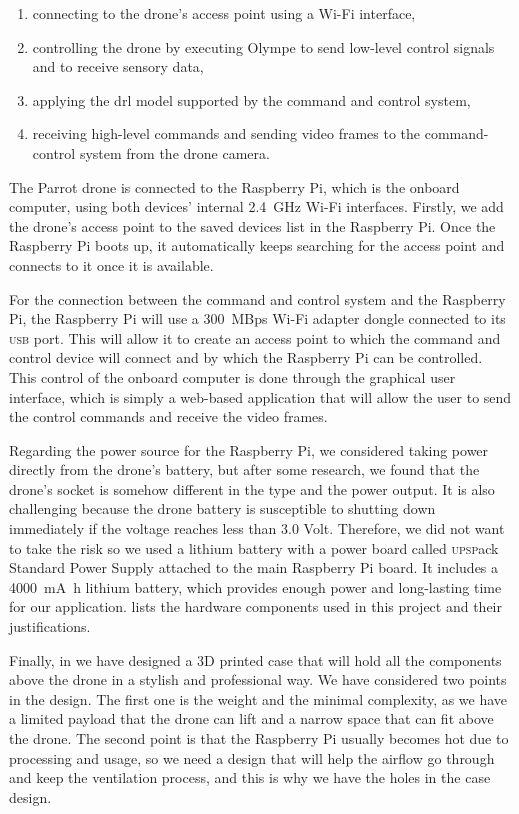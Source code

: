 \documentclass[../main.tex]{subfiles}
\begin{document}
\begin{enumerate}
	\item connecting to the drone's access point 
	using a Wi-Fi interface,
	\item controlling the drone 
	by executing Olympe to send low-level control signals 
	and to receive sensory data,
	\item applying the \gls{drl} model supported by 
	the command and control system,
	\item receiving high-level commands and sending video 
	frames to the command-control system from the drone camera.
\end{enumerate}
 
The Parrot \anafi drone is connected 
to the Raspberry Pi, which is the onboard computer,
using both devices' internal 
\SI{2.4}{\giga\hertz}
Wi-Fi interfaces. 
Firstly, we add the \anafi drone's access point 
to the saved devices list in the Raspberry Pi.
Once the Raspberry Pi boots up, it automatically keeps 
searching for the access point and connects 
to it once it is available.

For the connection between the command and control system 
and the Raspberry Pi, 
the Raspberry Pi will use a 
\SI[per-mode=symbol,per-symbol=p]{300}{MBps} 
Wi-Fi adapter dongle connected to 
its \textsc{usb} port. 
This will allow it to create an access point to which 
the command and control device will connect and by which 
the Raspberry Pi can be controlled. This control of the 
onboard computer is done through the graphical user interface,
which is simply a web-based application 
that will allow the user to send the
control commands and receive the video frames. 

Regarding the power source for the Raspberry Pi, 
we considered taking power directly from the 
drone's battery, but after some research, we found 
that the \anafi drone's  
socket is somehow different in the type and the power output. It is also challenging 
because the drone battery is susceptible to shutting down 
immediately if the voltage reaches less than 3.0 Volt. 
Therefore, we did not want to take the risk so we used a 
lithium battery with a power board called 
\textsc{upsp}ack Standard Power Supply attached to 
the main Raspberry Pi board. It includes a 
\SI{4000}{\milli\ampere\hour}
lithium battery, which provides enough power 
and long-lasting time for our application.
 lists the hardware components
used in this project and their justifications. 

Finally, in  we have designed a 3D printed case that 
will hold all the components above the drone in 
a stylish and professional way. We have considered two 
points in the design. The first one is the weight and the minimal
complexity, as we have a limited payload that the drone 
can lift and a narrow space that can fit above the drone.
The second point is that the Raspberry Pi usually 
becomes hot due to processing and usage, so we need 
a design that will help the airflow go through and keep 
the ventilation process, and this is why we have 
the holes in the case design.   
\end{document}
